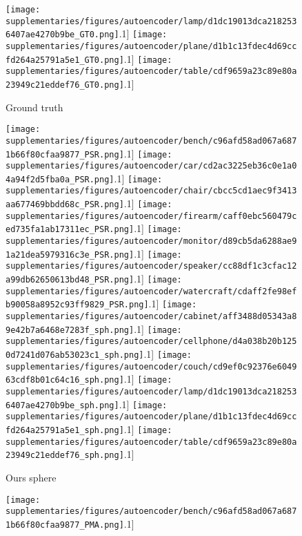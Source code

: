 \documentclass[10pt,twocolumn,letterpaper]{article}
\begin{document}
\begin{figure*}[t!]
\begin{subfigure}[b]{0.24\linewidth}
 \texttt{[image: supplementaries/figures/autoencoder/lamp/d1dc19013dca2182536407ae4270b9be\_GT0.png]}\0.1\linewidth]
 \texttt{[image: supplementaries/figures/autoencoder/plane/d1b1c13fdec4d69ccfd264a25791a5e1\_GT0.png]}\0.1\linewidth]
 \texttt{[image: supplementaries/figures/autoencoder/table/cdf9659a23c89e80a23949c21eddef76\_GT0.png]}\0.1\linewidth]
\caption{Ground truth}
\end{subfigure}
\begin{subfigure}[b]{0.24\linewidth}
\centering
 \texttt{[image: supplementaries/figures/autoencoder/bench/c96afd58ad067a6871b66f80cfaa9877\_PSR.png]}\0.1\linewidth]
 \texttt{[image: supplementaries/figures/autoencoder/car/cd2ac3225eb36c0e1a04a94f2d5fba0a\_PSR.png]}\0.1\linewidth]
 \texttt{[image: supplementaries/figures/autoencoder/chair/cbcc5cd1aec9f3413aa677469bbdd68c\_PSR.png]}\0.1\linewidth]
 \texttt{[image: supplementaries/figures/autoencoder/firearm/caff0ebc560479ced735fa1ab17311ec\_PSR.png]}\0.1\linewidth]
 \texttt{[image: supplementaries/figures/autoencoder/monitor/d89cb5da6288ae91a21dea5979316c3e\_PSR.png]}\0.1\linewidth]
 \texttt{[image: supplementaries/figures/autoencoder/speaker/cc88df1c3cfac12a99db62650613bd48\_PSR.png]}\0.1\linewidth]
 \texttt{[image: supplementaries/figures/autoencoder/watercraft/cdaff2fe98efb90058a8952c93ff9829\_PSR.png]}\0.1\linewidth]
 \texttt{[image: supplementaries/figures/autoencoder/cabinet/aff3488d05343a89e42b7a6468e7283f\_sph.png]}\0.1\linewidth]
 \texttt{[image: supplementaries/figures/autoencoder/cellphone/d4a038b20b1250d7241d076ab53023c1\_sph.png]}\0.1\linewidth]
 \texttt{[image: supplementaries/figures/autoencoder/couch/cd9ef0c92376e604963cdf8b01c64c16\_sph.png]}\0.1\linewidth]
 \texttt{[image: supplementaries/figures/autoencoder/lamp/d1dc19013dca2182536407ae4270b9be\_sph.png]}\0.1\linewidth]
 \texttt{[image: supplementaries/figures/autoencoder/plane/d1b1c13fdec4d69ccfd264a25791a5e1\_sph.png]}\0.1\linewidth]
 \texttt{[image: supplementaries/figures/autoencoder/table/cdf9659a23c89e80a23949c21eddef76\_sph.png]}\0.1\linewidth]
\caption{Ours sphere}
\end{subfigure}
\begin{subfigure}[b]{0.24\linewidth}
\centering
 \texttt{[image: supplementaries/figures/autoencoder/bench/c96afd58ad067a6871b66f80cfaa9877\_PMA.png]}\0.1\linewidth]

\end{subfigure}
\end{figure*}
\end{document}

